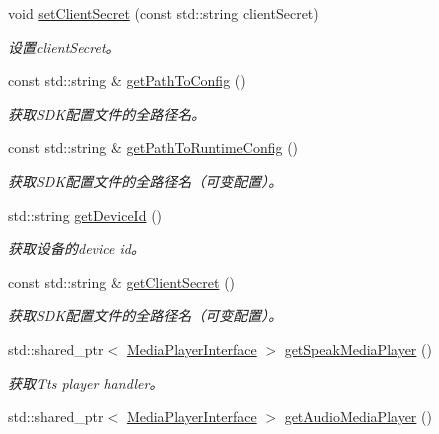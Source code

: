\begin{DoxyCompactItemize}
void \hyperlink{structduerOSDcsSDK_1_1sdkInterfaces_1_1DcsSdkParameters_a0206523f4fd71ef4730b12030dcb7cd1}{set\+Client\+Secret} (const std\+::string client\+Secret)
\begin{DoxyCompactList}\small\item\em 设置client\+Secret。 \end{DoxyCompactList}\item 
const std\+::string \& \hyperlink{structduerOSDcsSDK_1_1sdkInterfaces_1_1DcsSdkParameters_a15acf1146e64b5f08d8b0017c07eb09e}{get\+Path\+To\+Config} ()
\begin{DoxyCompactList}\small\item\em 获取\+S\+D\+K配置文件的全路径名。 \end{DoxyCompactList}\item 
const std\+::string \& \hyperlink{structduerOSDcsSDK_1_1sdkInterfaces_1_1DcsSdkParameters_a0700d03aa8a280cbd5f93ef0e40e55a5}{get\+Path\+To\+Runtime\+Config} ()
\begin{DoxyCompactList}\small\item\em 获取\+S\+D\+K配置文件的全路径名（可变配置）。 \end{DoxyCompactList}\item 
std\+::string \hyperlink{structduerOSDcsSDK_1_1sdkInterfaces_1_1DcsSdkParameters_a7d1bced577a3150094f87fd9c39792c8}{get\+Device\+Id} ()
\begin{DoxyCompactList}\small\item\em 获取设备的device id。 \end{DoxyCompactList}\item 
const std\+::string \& \hyperlink{structduerOSDcsSDK_1_1sdkInterfaces_1_1DcsSdkParameters_a7440f93b6b2f3ad352ebc7cdfee9cf7d}{get\+Client\+Secret} ()
\begin{DoxyCompactList}\small\item\em 获取\+S\+D\+K配置文件的全路径名（可变配置）。 \end{DoxyCompactList}\item 
std\+::shared\+\_\+ptr$<$ \hyperlink{classduerOSDcsSDK_1_1sdkInterfaces_1_1MediaPlayerInterface}{Media\+Player\+Interface} $>$ \hyperlink{structduerOSDcsSDK_1_1sdkInterfaces_1_1DcsSdkParameters_a137453bcd818997f0916d48e60af3523}{get\+Speak\+Media\+Player} ()
\begin{DoxyCompactList}\small\item\em 获取\+Tts player handler。 \end{DoxyCompactList}\item 
std\+::shared\+\_\+ptr$<$ \hyperlink{classduerOSDcsSDK_1_1sdkInterfaces_1_1MediaPlayerInterface}{Media\+Player\+Interface} $>$ \hyperlink{structduerOSDcsSDK_1_1sdkInterfaces_1_1DcsSdkParameters_a778d9c0e35063af224264cb4c2d69b67}{get\+Audio\+Media\+Player} ()

\end{DoxyCompactItemize}
